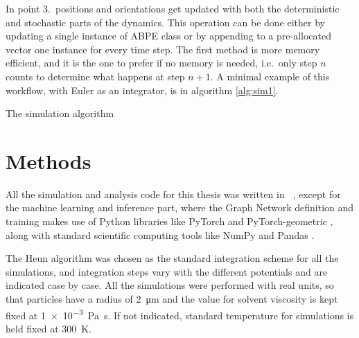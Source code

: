 \documentclass[../../master_thesis_np.tex]{subfiles}
\begin{document}
	In point 3.\ positions and orientations get updated with both the deterministic and stochastic parts of the dynamics. 
	This operation can be done either by updating a single instance of ABPE class or by appending to a pre-allocated vector one instance for every time step. 
	The first method is more memory efficient, and it is the one to prefer if no memory is needed, i.e.\ only step $n$ counts to determine what happens at step $n+1$. 
	A minimal example of this workflow, with Euler as an integrator, is in algorithm \ref{alg:sim1}.
	
	\begin{algorithm}
		\caption{The simulation algorithm} \label{alg:sim1}	
		\begin{algorithmic}[1]
			\EndFor
			\EndFor
			\EndFor
		\end{algorithmic}
	\end{algorithm}  
	
	\section{Methods}
	All the simulation and analysis code for this thesis was written in \julia\ \cite{julia}, except for the machine learning and inference part, where the Graph Network definition and training makes use of Python libraries like PyTorch \cite{pytorch} and PyTorch-geometric \cite{pyg}, along with standard scientific computing tools like NumPy \cite{numpy} and Pandas \cite{pandas}.
	
	{\color{brown}The Heun algorithm} was chosen as the standard integration scheme for all the simulations, and integration steps vary with the different potentials and are indicated case by case. 
	All the simulations were performed with real units, so that particles have a radius of \SI{2}{\um} and the value for solvent viscosity is kept fixed at \SI{1e-3}{\pascal\second}. 
	If not indicated, standard temperature for simulations is held fixed at \SI{300}{\kelvin}.
	
\end{document}
